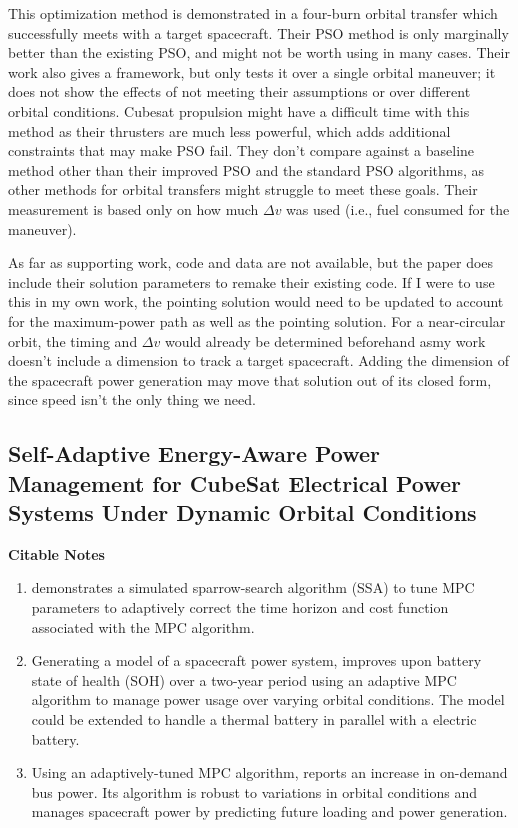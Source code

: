 This optimization method is demonstrated in a four-burn orbital transfer which successfully meets with a target spacecraft. Their PSO method is only marginally better than the existing PSO, and might not be worth using in many cases. Their work also gives a framework, but only tests it over a single orbital maneuver; it does not show the effects of not meeting their assumptions or over different orbital conditions. Cubesat propulsion might have a difficult time with this method as their thrusters are much less powerful, which adds additional constraints that may make PSO fail. They don't compare against a baseline method other than their improved PSO and the standard PSO algorithms, as other methods for orbital transfers might struggle to meet these goals. Their measurement is based only on how much $\Delta v$ was used (i.e., fuel consumed for the maneuver).

As far as supporting work, code and data are not available, but the paper does include their solution parameters to remake their existing code. If I were to use this in my own work, the pointing solution would need to be updated to account for the maximum-power path as well as the pointing solution. For a near-circular orbit, the timing and $\Delta v$ would already be determined beforehand asmy work doesn't include a dimension to track a target spacecraft. Adding the dimension of the spacecraft power generation may move that solution out of its closed form, since speed isn't the only thing we need.

\subsection{Self-Adaptive Energy-Aware Power Management for CubeSat Electrical Power Systems Under Dynamic Orbital Conditions}

\textbf{Citable Notes} 

\begin{enumerate}
    \item \cite{akarneSelfAdaptiveEnergyAwarePower2026} demonstrates a simulated sparrow-search algorithm (SSA) to tune MPC parameters to adaptively correct the time horizon and cost function associated with the MPC algorithm.
    \item Generating a model of a spacecraft power system, \cite{akarneSelfAdaptiveEnergyAwarePower2026} improves upon battery state of health (SOH) over a two-year period using an adaptive MPC algorithm to manage power usage over varying orbital conditions. The model could be extended to handle a thermal battery in parallel with a electric battery.
    \item Using an adaptively-tuned MPC algorithm, \cite{akarneSelfAdaptiveEnergyAwarePower2026} reports an increase in on-demand bus power. Its algorithm is robust to variations in orbital conditions and manages spacecraft power by predicting future loading and power generation.
\end{enumerate} 

